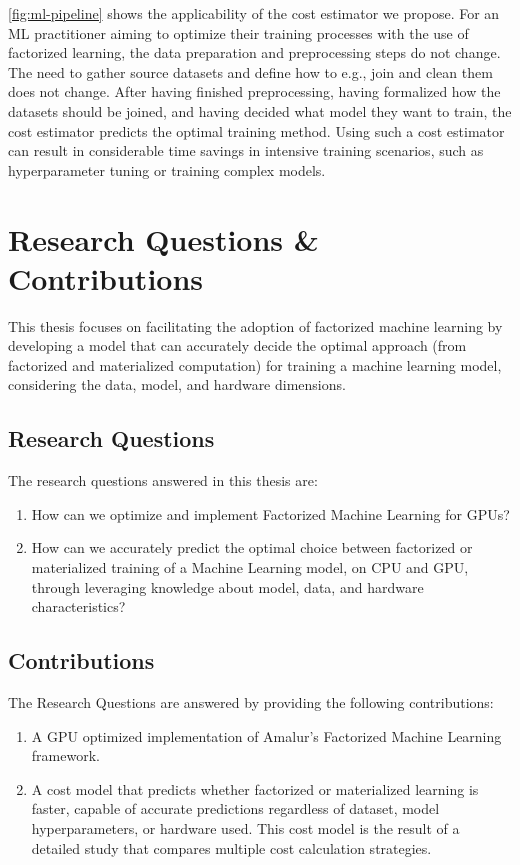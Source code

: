 \autoref{fig:ml-pipeline} shows the applicability of the cost estimator we propose. For an ML practitioner aiming to optimize their training processes with the use of factorized learning, the data preparation and preprocessing steps do not change. The need to gather source datasets and define how to e.g., join and clean them does not change. After having finished preprocessing, having formalized how the datasets should be joined, and having decided what model they want to train, the cost estimator predicts the optimal training method. Using such a cost estimator can result in considerable time savings in intensive training scenarios, such as hyperparameter tuning or training complex models.


\section{Research Questions \& Contributions}
This thesis focuses on facilitating the adoption of factorized machine learning by developing a model that can accurately decide the optimal approach (from factorized and materialized computation) for training a machine learning model, considering the data, model, and hardware dimensions.

\subsection{Research Questions}
The research questions answered in this thesis are:
\begin{enumerate}[leftmargin=1.5cm, label=\emph{RQ.\arabic*}]
    \item How can we optimize and implement Factorized Machine Learning for GPUs?
    \item How can we accurately predict the optimal choice between factorized or materialized training of a Machine Learning model, on CPU and GPU, through leveraging knowledge about model, data, and hardware characteristics?
\end{enumerate}

\subsection{Contributions}
The Research Questions are answered by providing the following contributions:
\begin{enumerate}[leftmargin=1.5cm, label=\emph{C.\arabic*}]
    \item A GPU optimized implementation of Amalur's Factorized Machine Learning framework.
    \item A cost model that predicts whether factorized or materialized learning is faster, capable of accurate predictions regardless of dataset, model hyperparameters, or hardware used. This cost model is the result of a detailed study that compares multiple cost calculation strategies.
\end{enumerate}

